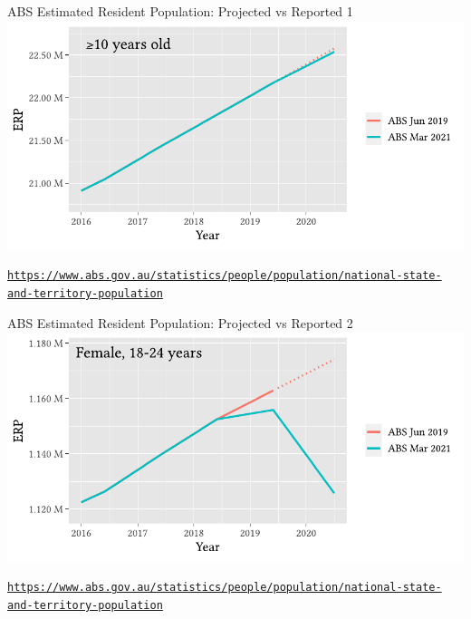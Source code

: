 \documentclass[aspectratio=169,12pt]{beamer} %
\begin{document}
\begin{frame}{ABS Estimated Resident Population: Projected vs Reported 1}
	\center\includegraphics[height=0.75\textheight]{ref/pops-overall.pdf}
	\begin{flushright}\tiny\texttt{\url{https://www.abs.gov.au/statistics/people/population/national-state-and-territory-population}}\end{flushright}
\end{frame}

\begin{frame}{ABS Estimated Resident Population: Projected vs Reported 2}
	\center\includegraphics[height=0.75\textheight]{ref/pops-f18-24.pdf}
	\begin{flushright}\tiny\texttt{\url{https://www.abs.gov.au/statistics/people/population/national-state-and-territory-population}}\end{flushright}
\end{frame}
\end{document}
